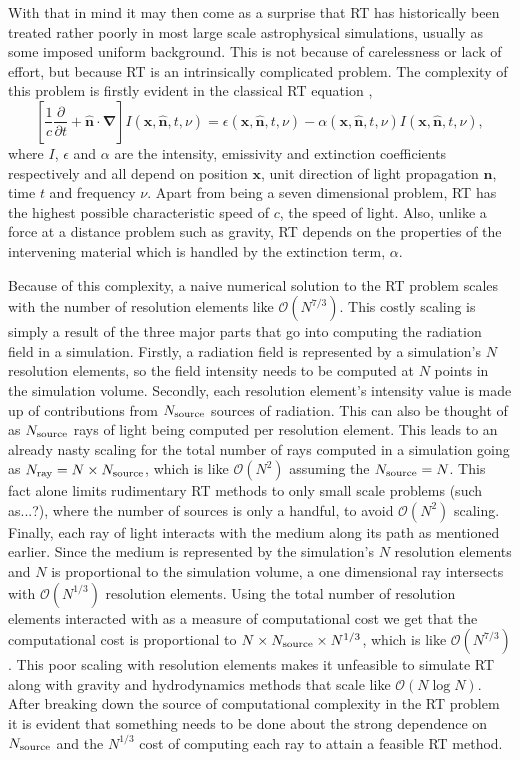 \documentclass[fleq,usenatbib]{mnras}
\newcommand{\bigO}[1]{\mathcal{O}\left(#1\right)}
\newcommand{\NS}{N_{\rm source}}
\newcommand{\NR}{N_{\rm ray}}
\begin{document}
With that in mind it may then come as a surprise that RT has historically been 
treated rather poorly in most large scale astrophysical simulations, usually 
as some imposed uniform background. This is not because of carelessness or 
lack of effort, but because RT is an intrinsically complicated problem. The
complexity of this problem is firstly evident in the classical RT equation 
\citep[e.g.][]{mihalasMihalas84},
\begin{equation} \label{eq:classicrt}
\left[ \frac{1}{c} \frac{\partial}{\partial t} + \mathbf{\hat{n} \cdot \nabla}
 \right] I\left(\mathbf{x}, \mathbf{\hat{n}}, t, \nu\right) = 
\epsilon\left(\mathbf{x}, \mathbf{\hat{n}}, t, \nu\right) - 
\alpha\left(\mathbf{x}, \mathbf{\hat{n}}, t, \nu\right) 
I\left(\mathbf{x}, \mathbf{\hat{n}}, t, \nu\right),
\end{equation} 
where $I$, $\epsilon$ and $\alpha$ are the intensity, emissivity and 
extinction coefficients respectively and all depend on position $\mathbf{x}$, 
unit direction of light propagation $\mathbf{\hat{n}}$, time $t$ and frequency 
$\nu$. Apart from being a seven dimensional problem, RT has the highest 
possible characteristic speed of $c$, the speed of light. Also, unlike a force 
at a distance problem such as gravity, RT depends on the properties of the 
intervening material which is handled by the extinction term, $\alpha$.

Because of this complexity, a naive numerical solution to the RT problem 
scales with the number of resolution elements like $\bigO{N^{7/3}}$. This 
costly scaling is simply a result of the three major parts that go into 
computing the radiation field in a simulation. Firstly, a radiation field is 
represented by a simulation's $N$ resolution elements, so the field intensity 
needs to be computed at $N$ points in the simulation volume. Secondly, each 
resolution element's intensity value is made up of contributions from $\NS$ 
sources of radiation. This can also be thought of as $\NS$ rays of light being 
computed per resolution element. This leads to an already nasty scaling for 
the total number of rays computed in a simulation going as $\NR = N 
\times \NS$, which is like $\bigO{N^2}$ assuming the $\NS = N$. This fact 
alone limits rudimentary RT methods to only small scale problems 
(such as...?), where the number of sources is only a handful, to avoid 
$\bigO{N^2}$ scaling. Finally, each ray of light interacts with the medium 
along its path as mentioned earlier. Since the medium is represented by the 
simulation's $N$ resolution elements and $N$ is proportional to the simulation 
volume, a one dimensional ray intersects with $\bigO{N^{1/3}}$ resolution 
elements. Using the total number of resolution elements interacted with as a 
measure of computational cost we get that the computational cost is 
proportional to $N \times \NS \times N^{1/3}$, which is like $\bigO{N^{7/3}}$. 
This poor scaling with resolution elements makes it unfeasible to simulate RT 
along with gravity and hydrodynamics methods that scale like $\bigO{N\log N}$. 
After breaking down the source of computational complexity in the RT problem 
it is evident that something needs to be done about the strong dependence on 
$\NS$ and the $N^{1/3}$ cost of computing each ray to attain a feasible RT 
method.
\end{document}
